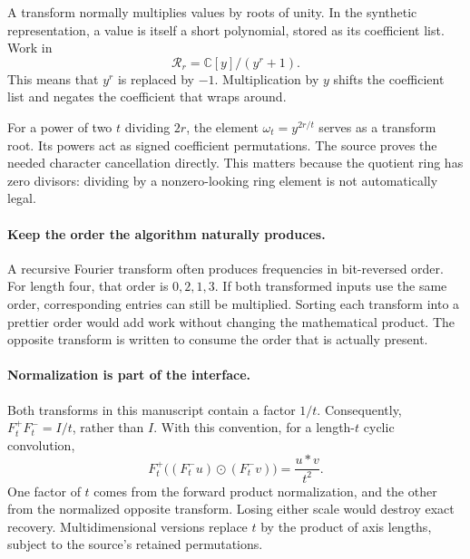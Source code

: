 
A transform normally multiplies values by roots of unity. In the synthetic
representation, a value is itself a short polynomial, stored as its coefficient
list. Work in
\[
 \mathcal R_r=\mathbb C[y]/(y^r+1).
\]
This means that $y^r$ is replaced by $-1$. Multiplication by $y$ shifts the
coefficient list and negates the coefficient that wraps around.


For a power of two $t$ dividing $2r$, the element $\omega_t=y^{2r/t}$
serves as a transform root. Its powers act as signed coefficient permutations.
The source proves the needed character cancellation directly. This matters
because the quotient ring has zero divisors: dividing by a nonzero-looking
ring element is not automatically legal.

\paragraph{Keep the order the algorithm naturally produces.}
A recursive Fourier transform often produces frequencies in bit-reversed
order. For length four, that order is $0,2,1,3$. If both transformed inputs
use the same order, corresponding entries can still be multiplied. Sorting
each transform into a prettier order would add work without changing the
mathematical product. The opposite transform is written to consume the order
that is actually present.

\paragraph{Normalization is part of the interface.}
Both transforms in this manuscript contain a factor $1/t$. Consequently,
$F_t^+F_t^-=I/t$, rather than $I$. With this convention, for a length-$t$
cyclic convolution,
\[
 F_t^+\bigl((F_t^-u)\odot(F_t^-v)\bigr)=\frac{u*v}{t^2}.
\]
One factor of $t$ comes from the forward product normalization, and the
other from the normalized opposite transform. Losing either scale would
destroy exact recovery. Multidimensional versions replace $t$ by the product
of axis lengths, subject to the source's retained permutations.

